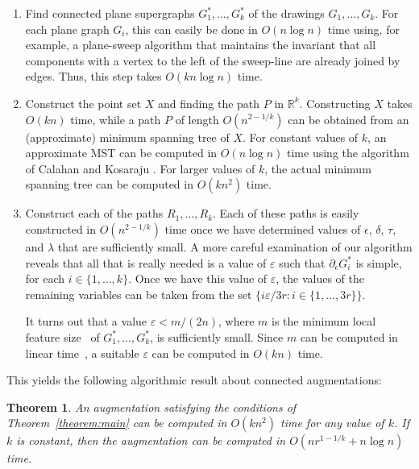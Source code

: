 \documentclass[11pt]{patmorin}
\newtheorem{theorem}{Theorem}[section]
\begin{document}
\begin{enumerate}
  \item Find connected plane supergraphs $G_1^*,\ldots,G_k^*$
  of the drawings $G_1,\ldots,G_k$.  For each plane graph $G_i$, this
  can easily be done in $O(n\log n)$ time using, for example, a plane-sweep
  algorithm that maintains the invariant that all components with
  a vertex to the left of the sweep-line are already joined by edges.
  Thus, this step takes $O(kn\log n)$ time.

  \item Construct the point set $X$ and finding the path
  $P$ in $\mathbb{R}^k$.  Constructing $X$ takes $O(kn)$ time, while a path $P$ of length
  $O(n^{2-1/k})$ can be obtained from an (approximate) minimum spanning
  tree of $X$.  For constant values of $k$, an approximate MST can
  be computed in $O(n\log n)$ time using the algorithm of Calahan and
  Kosaraju \cite{callahan.kosaraju:faster}.  For larger values of $k$,
  the actual minimum spanning tree can be computed in $O(kn^2)$ time.

  \item Construct each of the paths $R_1,\ldots,R_k$.
  Each of these paths is easily constructed in $O(n^{2-1/k})$ time
  once we have determined values of $\epsilon$, $\delta$, $\tau$, and
  $\lambda$ that are sufficiently small.  A more careful examination
  of our algorithm reveals that all that is really needed is
  a value of $\varepsilon$ such that $\partial_\epsilon G_i^*$ is
  simple, for each $i\in\{1,\ldots,k\}$.  Once we have this value of
  $\varepsilon$, the values of the remaining variables can be taken from
  the set $\{i\varepsilon/3r:i\in\{1,\ldots,3r\}\}$.

  It turns out that a value $\varepsilon < m/(2n)$, where $m$ is 
  the minimum local feature size~\cite{ruppert1995delaunay} of $G_1^*, \ldots, G_k^*$, is sufficiently small.
  Since $m$ can be computed in linear time~\cite{chin1995finding}, 
  a suitable $\varepsilon$ can be computed in $O(kn)$ time.	
\end{enumerate}

This yields the following algorithmic result about connected augmentations:

\begin{theorem}
  An augmentation satisfying the conditions of Theorem~\ref{theorem:main}
  can be computed in $O(kn^2)$ time for any value of $k$.  If $k$ is
  constant, then the augmentation can be computed in $O(nr^{1-1/k} + n\log n)$
  time.
\end{theorem}
\end{document}
